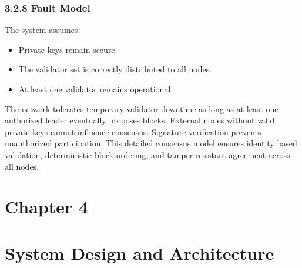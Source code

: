 \subsubsection*{3.2.8 Fault Model}
The system assumes:
\begin{itemize}
\item Private keys remain secure.
\item The validator set is correctly distributed to all nodes.
\item At least one validator remains operational.
\end{itemize}
The network tolerates temporary validator downtime as long as at least one authorized leader eventually proposes blocks.
External nodes without valid private keys cannot influence consensus. Signature verification prevents unauthorized participation.
This detailed consensus model ensures identity based validation, deterministic block ordering, and tamper resistant agreement across all nodes.

\newpage
\section*{Chapter 4}
\label{ch:4}

\section*{System Design and Architecture}

